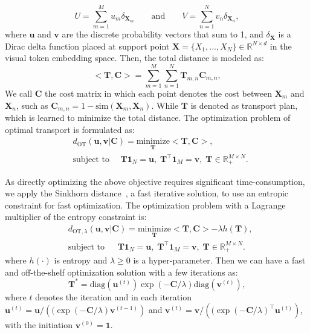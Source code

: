 \begin{equation} 
\label{eq:discrete}
    U=\sum_{m=1}^{M}u_m\delta_{\bm{X}_m} \hspace{2em} \text{and} \hspace{2em} V=\sum_{n=1}^{N}v_n\delta_{\bm{X}_n},
\end{equation}
where $\bm{u}$ and $\bm{v}$ are the discrete probability vectors that sum to 1, and $\delta_{\bm{X}}$ is a Dirac delta function placed at support point $\bm{X}=\{X_1,...,X_N\} \in \mathbb{R}^{N \times d}$ in the visual token embedding space.
Then, the total distance is modeled as:
\begin{equation} 
\label{eq:cost}
    <\bm{T},\bm{C}> = \sum_{m=1}^{M}\sum_{n=1}^{N}\bm{T}_{m,n}\bm{C}_{m,n},
\end{equation}
We call $\bm{C}$ the cost matrix in which each point denotes the cost between $\bm{X}_m$ and $\bm{X}_n$, such as $\bm{C}_{m,n}= 1- \text{sim}(\bm{X}_m,\bm{X}_{n})$. While $\bm{T} $ is denoted as transport plan, which is learned to minimize the total distance. The optimization problem of optimal transport is formulated as:
\begin{equation} 
\label{eq:optimization}
    \begin{aligned}
        & d_{\text{OT}}(\bm{u},\bm{v}|\bm{C}) = \underset{\bm{T}}{\text{minimize}}
         <\bm{T},\bm{C}>, \\
        & \text{subject to}
        ~~~~~~\bm{T}\bm{1}_N = \bm{u},\; \bm{T}^\top \bm{1}_M = \bm{v},\; \bm{T} \in \mathbb{R}^{M \times N}_+.
    \end{aligned}
\end{equation}

As directly optimizing the above objective requires significant time-consumption, we apply the Sinkhorn distance~\citep{cuturi2013sinkhorn}, a fast iterative solution, to use an entropic constraint for fast optimization. The optimization problem with a Lagrange multiplier of the entropy
constraint is:
\begin{equation} 
\label{eq:Sinkhorn}
    \begin{aligned}
        & d_{\text{OT},\lambda}(\bm{u},\bm{v}|\bm{C})=\underset{\bm{T}}{\text{minimize}}
         <\bm{T},\bm{C}> - \lambda h(\bm{T}), \\
        & \text{subject to}
        ~~~~~~~\bm{T}\bm{1}_N = \bm{u},\; \bm{T}^\top \bm{1}_M = \bm{v},\;
        \bm{T} \in \mathbb{R}^{M \times N}_+.
    \end{aligned}
\end{equation}
where $h(\cdot) $ is entropy and $\lambda \geq 0$ is a hyper-parameter. Then we can have a fast and off-the-shelf optimization solution with a few iterations as:
\begin{equation} 
\label{eq:Sinkhorn_optimization}
    \bm{T}^*= \text{diag}(\bm{u}^{(t)}) \exp(-\bm{C}/\lambda) \text{diag}(\bm{v}^{(t)}),
\end{equation}
where $t$ denotes the iteration and in each iteration 
$\bm{u}^{(t)} =\bm{u}/\left((\exp(-\bm{C}/\lambda)\bm{v}^{(t-1)}\right)$ and  $\bm{v}^{(t)} =\bm{v}/\left((\exp(-\bm{C}/\lambda)^\top\bm{u}^{(t)}\right) $, with the initiation $\bm{v}^{(0)} = \bm{1}$.


